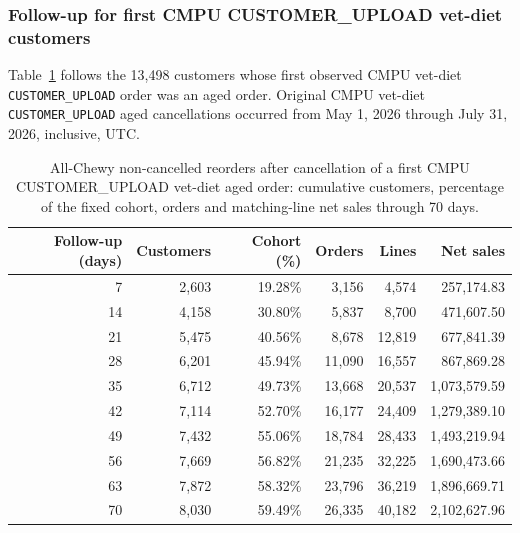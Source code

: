 \clearpage
\subsubsection{Follow-up for first CMPU CUSTOMER\_UPLOAD vet-diet customers}
Table~\ref{tab:financial-opportunity-new-upload-all-chewy} follows the
13,498 customers whose first observed CMPU vet-diet
\texttt{CUSTOMER\_UPLOAD} order was an aged order. Original CMPU vet-diet
\texttt{CUSTOMER\_UPLOAD} aged cancellations occurred from
May 1, 2026 through July 31, 2026, inclusive, UTC.

\begin{table}[!htbp]
\centering
\caption{All-Chewy non-cancelled reorders after cancellation of a first CMPU CUSTOMER\_UPLOAD vet-diet aged order: cumulative customers, percentage of the fixed cohort, orders and matching-line net sales through 70 days.}
\label{tab:financial-opportunity-new-upload-all-chewy}
\begin{tabular}{@{}rrrrrr@{}}
\toprule
Follow-up (days) & Customers & Cohort (\%) & Orders & Lines & Net sales \\
\midrule
7 & 2,603 & 19.28\% & 3,156 & 4,574 & 257,174.83 \\
14 & 4,158 & 30.80\% & 5,837 & 8,700 & 471,607.50 \\
21 & 5,475 & 40.56\% & 8,678 & 12,819 & 677,841.39 \\
28 & 6,201 & 45.94\% & 11,090 & 16,557 & 867,869.28 \\
35 & 6,712 & 49.73\% & 13,668 & 20,537 & 1,073,579.59 \\
42 & 7,114 & 52.70\% & 16,177 & 24,409 & 1,279,389.10 \\
49 & 7,432 & 55.06\% & 18,784 & 28,433 & 1,493,219.94 \\
56 & 7,669 & 56.82\% & 21,235 & 32,225 & 1,690,473.66 \\
63 & 7,872 & 58.32\% & 23,796 & 36,219 & 1,896,669.71 \\
70 & 8,030 & 59.49\% & 26,335 & 40,182 & 2,102,627.96 \\
\bottomrule
\end{tabular}


\end{table}
